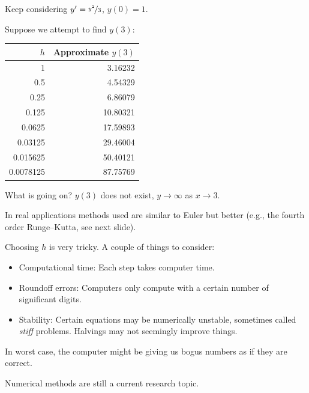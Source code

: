 \documentclass[10pt,aspectratio=169]{beamer}
\begin{document}
\begin{frame}
Keep considering
\quad $y' = \nicefrac{y^2}{3}$, \quad $y(0) = 1$.

\medskip
\pause

Suppose we attempt to find $y(3)$:

\begin{center}
\begin{tabular}{@{}rr@{}}
\toprule
$h$ & Approximate $y(3)$ \\
\midrule
1        & 3.16232 \\
0.5      & 4.54329 \\
0.25     & 6.86079 \\
0.125    & 10.80321 \\
0.0625   & 17.59893 \\
0.03125  & 29.46004 \\
0.015625 & 50.40121 \\
0.0078125& 87.75769 \\
\bottomrule
\end{tabular}
\end{center}

\pause
What is going on? \pause $y(3)$ does not exist, \pause $y \to \infty$ as $x \to 3$.

\end{frame}

\begin{frame}

In real applications methods used are similar to Euler
but better (e.g., the fourth order Runge--Kutta, see next slide).

\medskip
\pause

Choosing $h$ is very tricky.  A couple of things to consider:

\begin{itemize}
\item
\pause
Computational time: Each step takes computer time.
\item
\pause
Roundoff errors: Computers only compute with a certain number of
significant digits.
\item
\pause
Stability: Certain equations may be numerically unstable, sometimes
called \emph{stiff} problems.  Halvings may not seemingly improve things.
\end{itemize}

\medskip
\pause

In worst case, the computer might be giving us bogus numbers as if they are
correct.

\medskip
\pause

Numerical methods are still a current research topic.
\end{frame}
\end{document}
